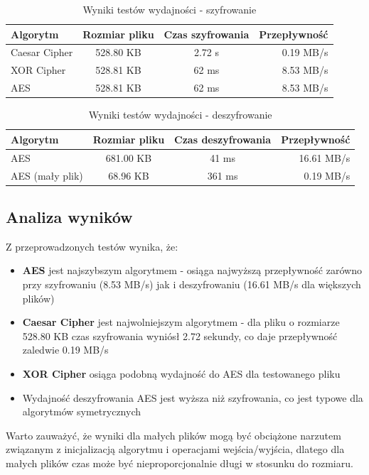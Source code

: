 \documentclass[12pt,a4paper]{article}
\begin{document}
\begin{table}[H]
\centering
\caption{Wyniki testów wydajności - szyfrowanie}
\label{tab:performance_encrypt}
\begin{tabular}{@{}lccr@{}}
\toprule
Algorytm & Rozmiar pliku & Czas szyfrowania & Przepływność \\
\midrule
Caesar Cipher & 528.80 KB & 2.72 s & 0.19 MB/s \\
XOR Cipher & 528.81 KB & 62 ms & 8.53 MB/s \\
AES & 528.81 KB & 62 ms & 8.53 MB/s \\
\bottomrule
\end{tabular}
\end{table}

\begin{table}[H]
\centering
\caption{Wyniki testów wydajności - deszyfrowanie}
\label{tab:performance_decrypt}
\begin{tabular}{@{}lccr@{}}
\toprule
Algorytm & Rozmiar pliku & Czas deszyfrowania & Przepływność \\
\midrule
AES & 681.00 KB & 41 ms & 16.61 MB/s \\
AES (mały plik) & 68.96 KB & 361 ms & 0.19 MB/s \\
\bottomrule
\end{tabular}
\end{table}

\subsection{Analiza wyników}

Z przeprowadzonych testów wynika, że:

\begin{itemize}
\item \textbf{AES} jest najszybszym algorytmem - osiąga najwyższą przepływność zarówno przy szyfrowaniu (8.53 MB/s) jak i deszyfrowaniu (16.61 MB/s dla większych plików)
\item \textbf{Caesar Cipher} jest najwolniejszym algorytmem - dla pliku o rozmiarze 528.80 KB czas szyfrowania wyniósł 2.72 sekundy, co daje przepływność zaledwie 0.19 MB/s
\item \textbf{XOR Cipher} osiąga podobną wydajność do AES dla testowanego pliku
\item Wydajność deszyfrowania AES jest wyższa niż szyfrowania, co jest typowe dla algorytmów symetrycznych
\end{itemize}

Warto zauważyć, że wyniki dla małych plików mogą być obciążone narzutem związanym z inicjalizacją algorytmu i operacjami wejścia/wyjścia, dlatego dla małych plików czas może być nieproporcjonalnie długi w stosunku do rozmiaru.
\end{document}
